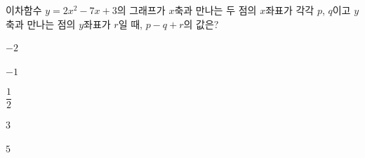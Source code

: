 \hspace*{2mm}\begin{minipage}[t]{\dimexpr\linewidth-2mm\relax}\vspace{0pt}
이차함수 $y=2x^2-7x+3$의 그래프가 $x$축과 만나는 두 점의 $x$좌표가 각각 $p$, $q$이고 $y$축과 만나는 점의 $y$좌표가 $r$일 때, $p-q+r$의 값은? 
\begin{choices32}{\rule[-3ex]{0pt}{8ex}$-2$}{\rule[-3ex]{0pt}{8ex}$-1$}{\rule[-3ex]{0pt}{8ex}$\dfrac{1}{2}$}{\rule[-3ex]{0pt}{8ex}$3$}{\rule[-3ex]{0pt}{8ex}$5$}\end{choices32}\end{minipage}

